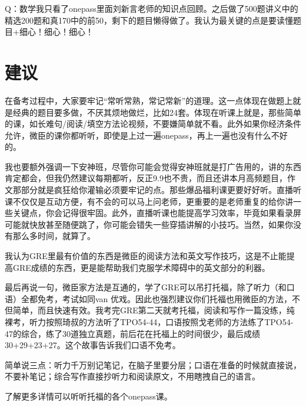 \documentclass[cn,plain]{./src/qyxfbook}
\begin{document}
			
			Q：数学我只看了onepass里面刘新言老师的知识点回顾。之后做了500题讲义中的精选200题和真170中的前50，剩下的题目懒得做了。我认为最关键的点是要读懂题目+细心！细心！细心！		
		
			
		\section{建议}
			在备考过程中，大家要牢记“常听常熟，常记常新”的道理。这一点体现在做题上就是经典的题目要多做，不厌其烦地做烂，比如24套。体现在听课上就是，那些简单的课，如长难句/阅读/填空方法论视频，不要嫌简单就不看。此外如果你经济条件允许，微臣的课你都听听，即使是上过一遍onepass，再上一遍也没有什么不好的。\par
			我也要额外强调一下安神班，尽管你可能会觉得安神班就是打广告用的，讲的东西肯定都会，但我仍然建议每期都听，反正9.9也不贵，而且还讲本月高频题目，作文那部分就是疯狂给你灌输必须要牢记的点。那些爆品福利课更要好好听。直播听课不仅仅是互动方便，有不会的可以马上问老师，更重要的是老师重复的给你讲一些关键点，你会记得很牢固。此外，直播听课也能提高学习效率，毕竟如果看录屏可能就快放甚至随便跳了，你可能会错失一些穿插讲解的小技巧。当然，如果你没有那么多时间，就算了。\par
			我认为GRE里最有价值的东西是微臣的阅读方法和英文写作技巧，这是不止能提高GRE成绩的东西，更是能帮助我们克服学术障碍中的英文部分的利器。\par
			最后再说一句，微臣家方法是互通的，学了GRE可以吊打托福，除了听力（和口语）全都免考，考试如同van \male 优戏。因此也强烈建议你们托福也用微臣的方法，不但简单，而且快速有效。我考完GRE第二天就考托福，阅读和写作一篇没练，纯裸考，听力按照琦叔的方法听了TPO54-44，口语按照戈老师的方法练了TPO54-47的综合，练了30道独立真题，前后花在托福上的时间很少，最后成绩30+29+23+27。这个故事告诉我们口语不免考。\par
			简单说三点：听力千万别记笔记，在脑子里要分层；口语在准备的时候就直接说，不要补笔记；综合写作直接抄听力和阅读原文，不用瞎拽自己的语言。\par
			了解更多详情可以听听托福的各个onepass课。
		
	
\end{document}
